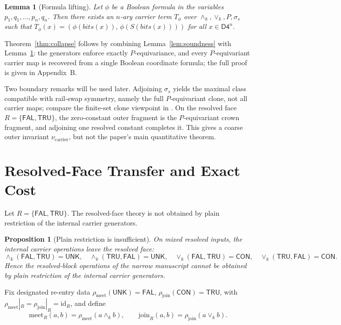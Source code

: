 \documentclass[11pt]{article}
\newtheorem{lemma}{Lemma}
\newtheorem{proposition}{Proposition}
\theoremstyle{remark}
\newcommand{\Dfour}{\ensuremath{\mathsf{D4}}}
\newcommand{\UNK}{\ensuremath{\mathsf{UNK}}}
\newcommand{\FAL}{\ensuremath{\mathsf{FAL}}}
\newcommand{\TRU}{\ensuremath{\mathsf{TRU}}}
\newcommand{\CON}{\ensuremath{\mathsf{CON}}}
\newcommand{\meetk}{\ensuremath{\wedge_k}}
\newcommand{\joink}{\ensuremath{\vee_k}}
\newcommand{\meetR}{\ensuremath{\mathrm{meet}_R}}
\newcommand{\joinR}{\ensuremath{\mathrm{join}_R}}
\newcommand{\bits}{\mathit{bits}}
\begin{document}
\begin{lemma}[Formula lifting]\label{lem:lifting}
Let $\phi$ be a Boolean formula in the variables $p_1,q_1,\dots,p_n,q_n$.
Then there exists an $n$-ary carrier term $T_\phi$ over
$\meetk,\joink,P,\sigma_s$ such that
$T_\phi(x)=(\phi(\bits(x)),\,\phi(S(\bits(x))))$ for all $x\in\Dfour^n$.
\end{lemma}

Theorem~\ref{thm:collapse} follows by combining Lemma~\ref{lem:soundness}
with Lemma~\ref{lem:lifting}: the generators enforce exactly
$P$-equivariance, and every $P$-equivariant carrier map is recovered from a
single Boolean coordinate formula; the full proof is given in Appendix~B.

Two boundary remarks will be used later. Adjoining $\sigma_s$ yields the
maximal class compatible with rail-swap symmetry, namely the full
$P$-equivariant clone, not all carrier maps; compare the finite-set clone
viewpoint in \cite{lau,post}. On the resolved face $R=\{\FAL,\TRU\}$, the
zero-constant outer fragment is the $P$-equivariant crown fragment, and
adjoining one resolved constant completes it. This gives a coarse outer
invariant $\nu_{\mathrm{carrier}}$, but not the paper's main quantitative
theorem.

\section{Resolved-Face Transfer and Exact Cost}\label{sec:transfer}

Let $R=\{\FAL,\TRU\}$. The resolved-face theory is not obtained by plain
restriction of the internal carrier generators.

\begin{proposition}[Plain restriction is insufficient]\label{prop:plain}
On mixed resolved inputs, the internal carrier operations leave the
resolved face:
\[
\meetk(\FAL,\TRU)=\UNK,\quad \meetk(\TRU,\FAL)=\UNK,\quad
\joink(\FAL,\TRU)=\CON,\quad \joink(\TRU,\FAL)=\CON.
\]
Hence the resolved-block operations of the narrow manuscript cannot be
obtained by plain restriction of the internal carrier generators.
\end{proposition}

Fix designated re-entry data $\rho_{\mathrm{meet}}(\UNK)=\FAL$,
$\rho_{\mathrm{join}}(\CON)=\TRU$, with
$\rho_{\mathrm{meet}}|_R=\rho_{\mathrm{join}}|_R=\mathrm{id}_R$, and define
\[
\meetR(a,b)=\rho_{\mathrm{meet}}(a\meetk b),\qquad
\joinR(a,b)=\rho_{\mathrm{join}}(a\joink b).
\]
\end{document}

